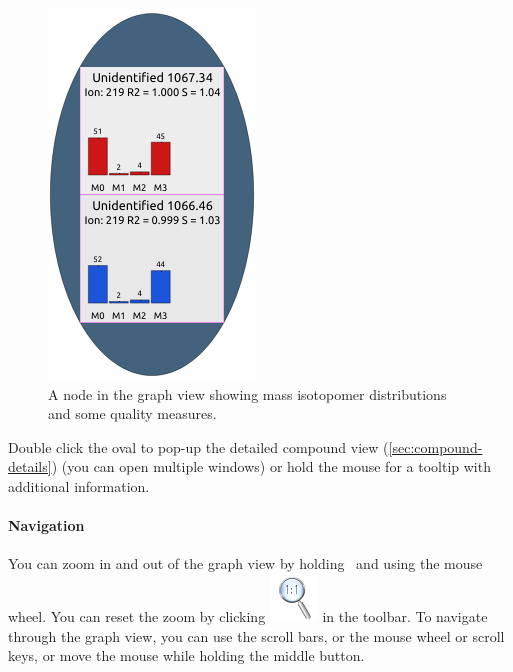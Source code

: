 \documentclass[a4paper,12pt]{scrartcl}
\newcommand*\keyctrl{\fbox{\textsc{Ctrl}}}
\begin{document}

\begin{figure}[htb]
 \centering
 \includegraphics[width=0.2\linewidth]{./gfx/ss_node.png}
 \caption{A node in the graph view showing mass isotopomer distributions and some quality measures.}
 \label{fig:compound-node}
\end{figure}

Double click the oval to pop-up the detailed compound view (\ref{sec:compound-details}) (you can open multiple windows) or hold the mouse for a tooltip with additional information.


\paragraph{Navigation}
You can zoom in and out of the graph view by holding \keyctrl\ and using the mouse wheel. You can reset the zoom by clicking \includegraphics{gfx/ico_zoom-original.png} in the toolbar. To navigate through the graph view, you can use the scroll bars, or the mouse wheel or scroll keys, or move the mouse while holding the middle button.
\end{document}
